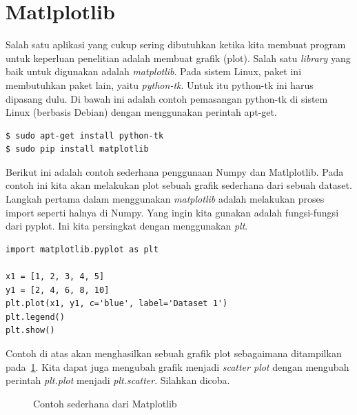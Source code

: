 \section{Matlplotlib}
Salah satu aplikasi yang cukup sering dibutuhkan ketika kita membuat program 
untuk keperluan penelitian adalah membuat grafik (plot). 
Salah satu {\em library} yang baik untuk digunakan adalah {\em matplotlib}. 
Pada sistem Linux, paket ini membutuhkan paket lain, yaitu {\em python-tk}. 
Untuk itu python-tk ini harus dipasang dulu. 
Di bawah ini adalah contoh pemasangan python-tk di sistem Linux (berbasis Debian) 
dengan menggunakan perintah apt-get.

\begin{verbatim}
$ sudo apt-get install python-tk
$ sudo pip install matplotlib
\end{verbatim}

Berikut ini adalah contoh sederhana penggunaan Numpy dan Matlplotlib.
Pada contoh ini kita akan melakukan plot sebuah grafik sederhana
dari sebuah dataset.
Langkah pertama dalam menggunakan {\em matplotlib} adalah melakukan
proses import seperti halnya di Numpy.
Yang ingin kita gunakan adalah fungsi-fungsi dari pyplot. Ini kita
persingkat dengan menggunakan {\em plt}.

\begin{verbatim}
import matplotlib.pyplot as plt

x1 = [1, 2, 3, 4, 5]
y1 = [2, 4, 6, 8, 10]
plt.plot(x1, y1, c='blue', label='Dataset 1')
plt.legend()
plt.show()
\end{verbatim}

Contoh di atas akan menghasilkan sebuah grafik plot sebagaimana
ditampilkan pada~\ref{fig:contoh1}.
Kita dapat juga mengubah grafik menjadi {\em scatter plot} dengan
mengubah perintah {\em plt.plot} menjadi {\em plt.scatter}.
Silahkan dicoba.

\begin{figure}[ht]
   \caption{Contoh sederhana dari Matplotlib}
   \label{fig:contoh1}
\end{figure}

